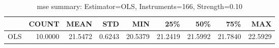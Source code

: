 \begin{table}[ht]
\centering
\caption{mse summary: Estimator=OLS, Instruments=166, Strength=0.10}
\begin{tabular}{lrrrrrrrr}
\toprule
 & COUNT & MEAN & STD & MIN & 25\% & 50\% & 75\% & MAX \\
\midrule
OLS & 10.0000 & 21.5472 & 0.6243 & 20.5379 & 21.2419 & 21.5992 & 21.7840 & 22.5929 \\
\bottomrule
\end{tabular}
\end{table}
